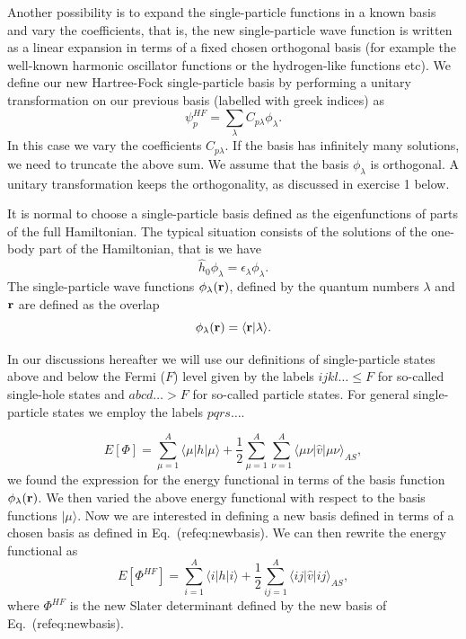 Another possibility is to expand the single-particle functions in a
known basis and vary the coefficients, that is, the new
single-particle wave function is written as a linear expansion in
terms of a fixed chosen orthogonal basis (for example the well-known
harmonic oscillator functions or the hydrogen-like functions etc).  We
define our new Hartree-Fock single-particle basis by performing a
unitary transformation on our previous basis (labelled with greek
indices) as
\begin{equation}
\psi_p^{HF}  = \sum_{\lambda} C_{p\lambda}\phi_{\lambda}. \label{eq:newbasis}
\end{equation}
In this case we vary the coefficients $C_{p\lambda}$. If the basis has
infinitely many solutions, we need to truncate the above sum.  We
assume that the basis $\phi_{\lambda}$ is orthogonal. A unitary
transformation keeps the orthogonality, as discussed in exercise 1
below.




It is normal to choose a single-particle basis defined as the
eigenfunctions of parts of the full Hamiltonian. The typical situation
consists of the solutions of the one-body part of the Hamiltonian,
that is we have
\[
\hat{h}_0\phi_{\lambda}=\epsilon_{\lambda}\phi_{\lambda}.
\]
The single-particle wave functions $\phi_{\lambda}({\bf r})$, defined
by the quantum numbers $\lambda$ and ${\bf r}$ are defined as the
overlap
\[
   \phi_{\lambda}({\bf r})  = \langle {\bf r} | \lambda \rangle .
\]




In our discussions hereafter we will use our definitions of
single-particle states above and below the Fermi ($F$) level given by
the labels $ijkl\dots \le F$ for so-called single-hole states and
$abcd\dots > F$ for so-called particle states.  For general
single-particle states we employ the labels $pqrs\dots$.





\[
  E[\Phi] = \sum_{\mu=1}^A \langle \mu | h | \mu \rangle
  + \frac{1}{2}\sum_{{\mu}=1}^A\sum_{{\nu}=1}^A \langle \mu\nu|\hat{v}|\mu\nu\rangle_{AS},
\]
we found the expression for the energy functional in terms of the
basis function $\phi_{\lambda}({\bf r})$. We then varied the above
energy functional with respect to the basis functions $|\mu \rangle$.
Now we are interested in defining a new basis defined in terms of a
chosen basis as defined in Eq.~(ref{eq:newbasis}). We can then rewrite
the energy functional as
\begin{equation}
  E[\Phi^{HF}] 
  = \sum_{i=1}^A \langle i | h | i \rangle +
  \frac{1}{2}\sum_{ij=1}^A\langle ij|\hat{v}|ij\rangle_{AS}, \label{FunctionalEPhi2}
\end{equation}
where $\Phi^{HF}$ is the new Slater determinant defined by the new
basis of Eq.~(ref{eq:newbasis}).





